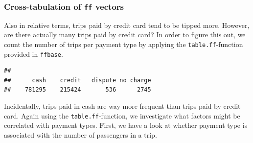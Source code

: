 \documentclass[
  12pt,
]{style/krantz}
\newenvironment{Shaded}{\begin{snugshade}}{\end{snugshade}}
\newcommand{\AttributeTok}[1]{\textcolor[rgb]{0.77,0.63,0.00}{#1}}
\newcommand{\CommentTok}[1]{\textcolor[rgb]{0.56,0.35,0.01}{\textit{#1}}}
\newcommand{\FunctionTok}[1]{\textcolor[rgb]{0.00,0.00,0.00}{#1}}
\newcommand{\NormalTok}[1]{#1}
\newcommand{\OtherTok}[1]{\textcolor[rgb]{0.56,0.35,0.01}{#1}}
\newcommand{\SpecialCharTok}[1]{\textcolor[rgb]{0.00,0.00,0.00}{#1}}
\newcommand{\StringTok}[1]{\textcolor[rgb]{0.31,0.60,0.02}{#1}}
\begin{document}
\hypertarget{cross-tabulation-of-ff-vectors}{%
\subsubsection{\texorpdfstring{Cross-tabulation of \texttt{ff} vectors}{Cross-tabulation of ff vectors}}\label{cross-tabulation-of-ff-vectors}}

Also in relative terms, trips paid by credit card tend to be tipped more. However, are there actually many trips paid by credit card? In order to figure this out, we count the number of trips per payment type by applying the \texttt{table.ff}-function provided in \texttt{ffbase}.

\begin{Shaded}
\end{Shaded}

\begin{verbatim}
## 
##      cash    credit   dispute no charge 
##    781295    215424       536      2745
\end{verbatim}

Incidentally, trips paid in cash are way more frequent than trips paid by credit card. Again using the \texttt{table.ff}-function, we investigate what factors might be correlated with payment types. First, we have a look at whether payment type is associated with the number of passengers in a trip.

\begin{Shaded}
\end{Shaded}
\end{document}
